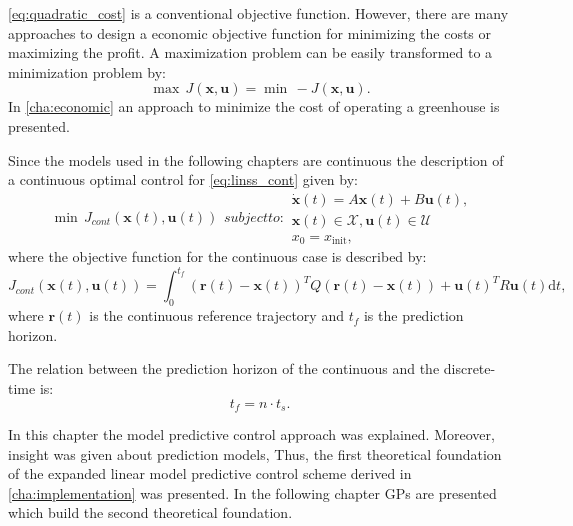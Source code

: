 \eqref{eq:quadratic_cost} is a conventional objective function.
However, there are many approaches to design a economic objective function for minimizing the costs or maximizing the profit. 
A maximization problem can be easily transformed to a minimization problem by:
\begin{equation}\label{eq:minmaxJ}
\max \, J(\mathbf{x},\mathbf{u}) = \min \, -J(\mathbf{x},\mathbf{u}).
\end{equation}
In \cref{cha:economic} an approach to minimize the cost of operating a greenhouse is presented.

Since the models used in the following chapters are continuous the description of a continuous optimal control for \eqref{eq:linss_cont} given by:
\begin{subequations} \label{eq:description_conventional_mpc_cont}
\begin{align}
\min \, J_{cont}(\mathbf{x}(t),\mathbf{u}(t)) 
\end{align}
subject to:
\begin{align}
\dot{\mathbf{x}}(t) = A\mathbf{x}(t)+B\mathbf{u}(t),\\
\mathbf{x}(t) \in \mathcal{X}, \mathbf{u}(t)  \in \mathcal{U} \\
x_0 = x_{\text{init}},
\end{align}
\end{subequations}
where the objective function for the continuous case is described by:
\begin{equation}\label{eq:quadratic_cost_cont}
J_{cont}(\mathbf{x}(t),\mathbf{u}(t)) = \int_{0}^{t_f} \! (\mathbf{r}(t)-\mathbf{x}(t))^TQ(\mathbf{r}(t)-\mathbf{x}(t))+\mathbf{u}(t)^TR\mathbf{u}(t)\mathrm{d}t,
\end{equation}
where $\mathbf{r}(t)$ is the continuous reference trajectory and ${t_f}$ is the prediction horizon.

The relation between the prediction horizon of the continuous and the discrete-time is:
\begin{equation}\label{eq:rel_cont_dis}
t_f = n \cdot t_s.
\end{equation}
\par\medskip

In this chapter the model predictive control approach was explained.
Moreover, insight was given about prediction models, 
Thus, the first theoretical foundation of the expanded linear model predictive control scheme derived in \cref{cha:implementation} was presented.
In the following chapter GPs are presented which build the second theoretical foundation.

